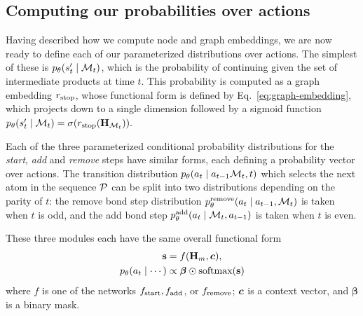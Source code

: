 \subsection{Computing our probabilities over actions}

Having described how we compute node and graph embeddings, we are now ready to define each of our parameterized distributions over actions.
The simplest of these is $p_\theta(s'_t \mid {\mathcal{M}}_t)$, which is the probability of continuing given the set of intermediate products at time $t$. 
This probability is computed as a graph embedding $r_{\textrm{stop}}$,
whose functional form is defined by Eq.~\eqref{eq:graph-embedding}, which projects down to a single dimension followed by a sigmoid function
$
p_\theta(s'_t \mid {\mathcal{M}}_t) = \sigma(r_{\textrm{stop}}({\mathbf{H}}_{{\mathcal{M}}_t})).
$

Each of the three parameterized conditional probability distributions for the {\em start}, {\em add} and {\em remove} steps have similar forms, each defining a probability vector over actions.
The transition distribution $p_\theta(a_t \mid a_{t-1} {\mathcal{M}}_t, t)$ 
which selects the next atom in the sequence ${\mathcal{P}}$
can be split into two distributions depending on the parity of $t$:
the remove bond step distribution $p_\theta^\textrm{remove}(a_t \mid a_{t-1}, {\mathcal{M}}_t)$ is taken when $t$ is odd, 
and the add bond step $p_\theta^\textrm{add}(a_t \mid {\mathcal{M}}_t, a_{t-1})$ is taken when $t$ is even. 

These three modules each have the same overall functional form
\begin{align}
\textbf{s} &= f({\mathbf{H}}_{m}, \bm{c}), \\
p_\theta(a_t \mid \cdots) &\propto \bm{\beta} \odot \mbox{softmax}(\bm{\textbf{s}})
\end{align}
where $f$ is one of the networks $f_{\textrm{start}}, f_{\textrm{add}}$, or $f_{\textrm{remove}}$; 
$\bm{c}$ is a context vector, and $\bm{\beta}$ is a binary mask.

